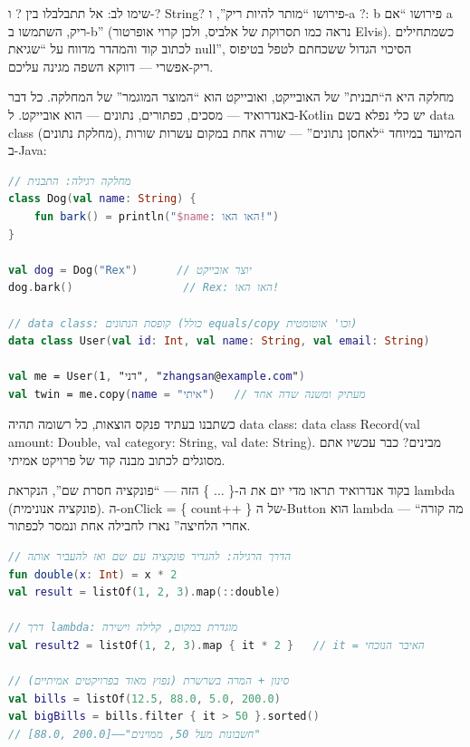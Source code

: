 \begin{tcbwarn}{שימו לב: אל תתבלבלו בין ? ו-?}
String? פירושו “מותר להיות ריק”, ו-a ?: b פירושו “אם a ריק, השתמשו ב-b” (נראה כמו תסרוקת של אלביס, ולכן קרוי אופרטור Elvis). כשמתחילים לכתוב קוד והמהדר מדווח על “שגיאת null”, הסיכוי הגדול ששכחתם לטפל בטיפוס ריק-אפשרי — דווקא השפה מגינה עליכם.

\end{tcbwarn}


מחלקה היא ה“תבנית” של האובייקט, ואובייקט הוא “המוצר המוגמר” של המחלקה. כל דבר באנדרואיד — מסכים, כפתורים, נתונים — הוא אובייקט. ל-Kotlin יש כלי נפלא בשם data class (מחלקת נתונים), המיועד במיוחד “לאחסן נתונים” — שורה אחת במקום עשרות שורות ב-Java:

\begin{lstlisting}[language=Kotlin]
// מחלקה רגילה: התבנית
class Dog(val name: String) {
    fun bark() = println("$name: האו האו!")
}

val dog = Dog("Rex")      // יוצר אובייקט
dog.bark()                 // Rex: האו האו!

// data class: קופסת הנתונים (כולל equals/copy וכו' אוטומטית)
data class User(val id: Int, val name: String, val email: String)

val me = User(1, "דני", "zhangsan@example.com")
val twin = me.copy(name = "איתי")   // מעתיק ומשנה שדה אחד
\end{lstlisting}

כשתבנו בעתיד פנקס הוצאות, כל רשומה תהיה data class: data class Record(val amount: Double, val category: String, val date: String). מבינים? כבר עכשיו אתם מסוגלים לכתוב מבנה קוד של פרויקט אמיתי.


בקוד אנדרואיד תראו מדי יום את ה-\{ ... \} הזה — “פונקציה חסרת שם”, הנקראת lambda (פונקציה אנונימית). ה-onClick = \{ count++ \} של ה-Button הוא lambda — “מה קורה אחרי הלחיצה” נארז לחבילה אחת ונמסר לכפתור.

\begin{lstlisting}[language=Kotlin]
// הדרך הרגילה: להגדיר פונקציה עם שם ואז להעביר אותה
fun double(x: Int) = x * 2
val result = listOf(1, 2, 3).map(::double)

// דרך lambda: מוגדרת במקום, קלילה וישירה
val result2 = listOf(1, 2, 3).map { it * 2 }   // it = האיבר הנוכחי

// סינון + המרה בשרשרת (נפוץ מאוד בפרויקטים אמיתיים)
val bills = listOf(12.5, 88.0, 5.0, 200.0)
val bigBills = bills.filter { it > 50 }.sorted()
// [88.0, 200.0]——"חשבונות מעל 50, ממוינים"
\end{lstlisting}

